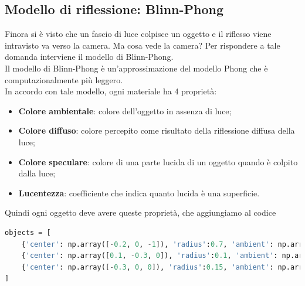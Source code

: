 \documentclass[9pt,a4paper,twoside]{tau}
\begin{document}
\subsection{Modello di riflessione: Blinn-Phong}
Finora si è visto che un fascio di luce colpisce un oggetto e il riflesso viene intravisto va verso la camera. Ma cosa vede la camera? Per rispondere a tale domanda interviene il modello di Blinn-Phong.\\
Il modello di Blinn-Phong è un'approssimazione del modello Phong che è computazionalmente più leggero.\\
In accordo con tale modello, ogni materiale ha 4 proprietà:
\begin{itemize}
	\item \textbf{Colore ambientale}: colore dell'oggetto in assenza di luce;
	\item \textbf{Colore diffuso}: colore percepito come risultato della riflessione diffusa della luce;
	\item \textbf{Colore speculare}: colore di una parte lucida di un oggetto quando è colpito dalla luce;
	\item \textbf{Lucentezza}: coefficiente che indica quanto lucida è una superficie.
\end{itemize}
Quindi ogni oggetto deve avere queste proprietà, che aggiungiamo al codice

\begin{lstlisting}[language=Python]
objects = [
    {'center': np.array([-0.2, 0, -1]), 'radius':0.7, 'ambient': np.array([0.1, 0, 0]), 'diffuse': np.array([0.7, 0, 0]), 'specular': np.array([1, 1, 1]), 'shininess':100},
    {'center': np.array([0.1, -0.3, 0]), 'radius':0.1, 'ambient': np.array([0.1, 0, 0.1]), 'diffuse': np.array([0.7, 0, 0.7]), 'specular': np.array([1, 1, 1]), 'shininess':100},
    {'center': np.array([-0.3, 0, 0]), 'radius':0.15, 'ambient': np.array([0, 0.1, 0]), 'diffuse': np.array([0, 0.6, 0]), 'specular': np.array([1, 1, 1]), 'shininess':100}
]
\end{lstlisting}
\end{document}
